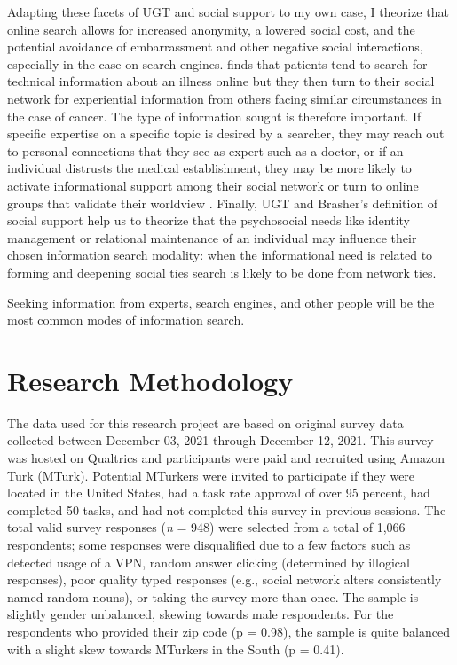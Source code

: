 Adapting these facets of UGT and social support to my own case, I theorize that
online search allows for increased anonymity, a lowered social cost, and the
potential avoidance of embarrassment and other negative social interactions,
especially in the case on search engines. \citet{rainsCopingIllnessDigitally2018}
finds that patients tend to search for
technical information about an illness online but they then turn to their social
network for experiential information from others facing similar circumstances in
the case of cancer. The type of information sought is therefore important.
If specific expertise on a specific topic is desired by a searcher, they may
reach out to personal connections that they see as expert such as a doctor, or
if an individual distrusts the medical establishment, they may be more likely to
activate informational support among their social network or turn to online
groups that validate their worldview \citep{bogersHowSocialAre2014}. Finally, UGT and
Brasher's definition of social support \citeyearpar{brashersInformationSeekingAvoiding2002}
help us to theorize that the psychosocial needs like identity management or relational
maintenance of an individual may influence their chosen information search modality: 
when the informational need is related to forming and deepening social ties search 
is likely to be done from network ties.

\begin{hyp} \label{hyp:drgooglefriend}
Seeking information from experts, search engines, and other people
will be the most common modes of information search. 
\end{hyp}

\hypertarget{research-methodology}{%
\section{Research Methodology}\label{research-methodology}}

The data used for this research project are based on original survey data
collected between December 03, 2021 through December 12, 2021.
This survey was hosted on Qualtrics and participants were paid and 
recruited using Amazon Turk (MTurk). Potential MTurkers were invited
to participate if they were located in the United States, had a task
rate approval of over 95 percent, had completed 50 tasks, and had not 
completed this survey in previous sessions. The total valid 
survey responses (\emph{n} = 948) were selected from a total of 1,066
respondents; some responses were disqualified due to a few factors such as
detected usage of a VPN, random answer clicking (determined by illogical
responses), poor quality typed responses (e.g., social network alters
consistently named random nouns), or taking the survey more than once. The sample
is slightly gender unbalanced, skewing towards male respondents. For the
respondents who provided their zip code (p = 0.98), the sample is quite balanced with
a slight skew towards MTurkers in the South (p = 0.41).

